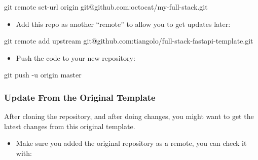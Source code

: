 \documentclass[
]{article}
\newenvironment{Shaded}{}{}
\newcommand{\AttributeTok}[1]{\textcolor[rgb]{0.49,0.56,0.16}{#1}}
\newcommand{\FunctionTok}[1]{\textcolor[rgb]{0.02,0.16,0.49}{#1}}
\newcommand{\NormalTok}[1]{#1}
\providecommand{\tightlist}{%
  \setlength{\itemsep}{0pt}\setlength{\parskip}{0pt}}
\begin{document}
\hypertarget{cb3}{}
\begin{Shaded}
\begin{Highlighting}[]
\FunctionTok{git}\NormalTok{ remote set{-}url origin git@github.com:octocat/my{-}full{-}stack.git}
\end{Highlighting}
\end{Shaded}

\begin{itemize}
\tightlist
\item
  Add this repo as another ``remote'' to allow you to get updates later:
\end{itemize}

\hypertarget{cb4}{}
\begin{Shaded}
\begin{Highlighting}[]
\FunctionTok{git}\NormalTok{ remote add upstream git@github.com:tiangolo/full{-}stack{-}fastapi{-}template.git}
\end{Highlighting}
\end{Shaded}

\begin{itemize}
\tightlist
\item
  Push the code to your new repository:
\end{itemize}

\hypertarget{cb5}{}
\begin{Shaded}
\begin{Highlighting}[]
\FunctionTok{git}\NormalTok{ push }\AttributeTok{{-}u}\NormalTok{ origin master}
\end{Highlighting}
\end{Shaded}

\hypertarget{update-from-the-original-template}{%
\subsubsection{Update From the Original
Template}\label{update-from-the-original-template}}

After cloning the repository, and after doing changes, you might want to
get the latest changes from this original template.

\begin{itemize}
\tightlist
\item
  Make sure you added the original repository as a remote, you can check
  it with:
\end{itemize}
\end{document}
